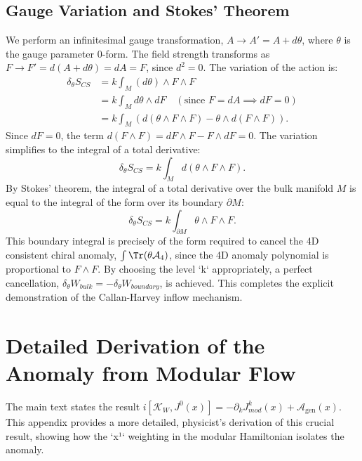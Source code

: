 \documentclass[11pt, letterpaper]{report}
\theoremstyle{plain} %
\theoremstyle{definition} %
\theoremstyle{remark} %
\newcommand{\BulkM}{M}
\newcommand{\BoundaryM}{\partial\BulkM}
\newcommand{\ModularK}{\mathcal{K}}
\newcommand{\AnomPoly}{\mathcal{A}}
\begin{document}
\subsection{Gauge Variation and Stokes' Theorem}
We perform an infinitesimal gauge transformation, $A \to A' = A + d\theta$, where $\theta$ is the gauge parameter 0-form. The field strength transforms as $F \to F' = d(A+d\theta) = dA = F$, since $d^2=0$.
The variation of the action is:
\begin{align}
    \delta_\theta S_{CS} &= k \int_{\BulkM} (d\theta) \wedge F \wedge F \\
    &= k \int_{\BulkM} d\theta \wedge dF \quad (\text{since } F=dA \implies dF=0) \\
    &= k \int_{\BulkM} (d(\theta \wedge F \wedge F) - \theta \wedge d(F \wedge F)).
\end{align}
Since $dF=0$, the term $d(F \wedge F) = dF \wedge F - F \wedge dF = 0$. The variation simplifies to the integral of a total derivative:
\begin{equation}
    \delta_\theta S_{CS} = k \int_{\BulkM} d(\theta \wedge F \wedge F).
\end{equation}
By Stokes' theorem, the integral of a total derivative over the bulk manifold $\BulkM$ is equal to the integral of the form over its boundary $\BoundaryM$:
\begin{equation}
    \delta_\theta S_{CS} = k \int_{\BoundaryM} \theta \wedge F \wedge F.
\end{equation}
This boundary integral is precisely of the form required to cancel the 4D consistent chiral anomaly, $\int \Tr(\theta \mathcal{A}_4)$, since the 4D anomaly polynomial is proportional to $F \wedge F$. By choosing the level `k` appropriately, a perfect cancellation, $\delta_\theta W_{bulk} = -\delta_\theta W_{boundary}$, is achieved. This completes the explicit demonstration of the Callan-Harvey inflow mechanism.

\section{Detailed Derivation of the Anomaly from Modular Flow}
\label{app:modular_commutator_derivation}

The main text states the result $i[\ModularK_W, J^0(x)] = -\partial_k J^k_{mod}(x) + \AnomPoly_{\text{gen}}(x)$. This appendix provides a more detailed, physicist's derivation of this crucial result, showing how the `x¹` weighting in the modular Hamiltonian isolates the anomaly.
\end{document}
